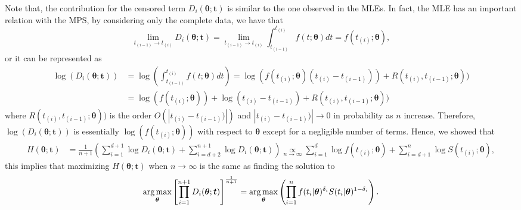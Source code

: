 \documentclass[10pt,a4paper,onecolumn]{article} %
\begin{document}
Note that, the contribution for the censored term $D_{i}(\boldsymbol{\theta};\boldsymbol{t})$ is similar to the one observed in the MLEs. In fact, the MLE has an important relation with the MPS, by considering only the complete data, we have that
\begin{equation}
\lim_{t_{(i-1)} \to t_{(i)}} D_{i}(\boldsymbol{\theta};\boldsymbol{t})=\lim_{t_{(i-1)} \to t_{(i)}} \int_{t_{(i-1)}}^{t_{(i)}}f(t;\boldsymbol{\theta})dt=f(t_{(i)};\boldsymbol{\theta}),
\end{equation}
or it can be represented as
\begin{equation}
\begin{aligned}
\log(D_{i}(\boldsymbol{\theta};\boldsymbol{t}))&=\log\left(\int_{t_{(i-1)}}^{t_{(i)}}f(t;\boldsymbol{\theta})dt \right)= \log\left(f(t_{(i)};\boldsymbol{\theta})(t_{(i)}-t_{(i-1)})\right)+R(t_{(i)},t_{(i-1)};\boldsymbol{\theta})) \\&= \log\left(f(t_{(i)};\boldsymbol{\theta})\right)+\log(t_{(i)}-t_{(i-1)})+R(t_{(i)},t_{(i-1)};\boldsymbol{\theta}))
\end{aligned}
\end{equation}
where $R(t_{(i)},t_{(i-1)};\boldsymbol{\theta}))$ is the order $O(|t_{(i)}-t_{(i-1)})|)$ and $|t_{(i)}-t_{(i-1)})|\rightarrow 0$ in probability as $n$ increase. Therefore, $\log(D_{i}(\boldsymbol{\theta};\boldsymbol{t}))$ is essentially $\log\left(f(t_{(i)};\boldsymbol{\theta})\right)$ with respect to $\boldsymbol{\theta}$ except for a negligible number of terms. Hence, we showed that
\begin{equation}
\begin{aligned}
H\left( \boldsymbol{\theta};\boldsymbol{t}\right) &=\frac{1}{n+1}\left(\sum_{i=1}^{d+1}\log
D_{i} ( \boldsymbol{\theta};\boldsymbol{t})+\sum_{i=d+2}^{n+1}\log
D_{i} ( \boldsymbol{\theta};\boldsymbol{t})\right)  \underset{n\rightarrow\infty}{\propto} \sum_{i=1}^{d}\log f(t_{(i)};\boldsymbol{\theta})+\sum_{i=d+1}^{n}\log
S(t_{(i)};\boldsymbol{\theta}),
\end{aligned}
\end{equation}
this implies that maximizing $H\left( \boldsymbol{\theta};\boldsymbol{t}\right)$ when $n\rightarrow\infty$ is the same as finding the solution to 
\begin{equation}\label{mpsmean2}
\underset{\boldsymbol{\theta}}{\operatorname{arg\,max}} \left[ \prod\limits_{i=1}^{n+1}D_{i}( \boldsymbol{\theta};\boldsymbol{t})\right] ^{%
\frac{1}{n+1}}=\underset{\boldsymbol{\theta}}{\operatorname{arg\,max}} \left(\prod_{i=1}^n f(t_i|\boldsymbol{\theta})^{\delta_i}S(t_i|\boldsymbol{\theta})^{1-\delta_i}\right).
\end{equation}%
\end{document}
